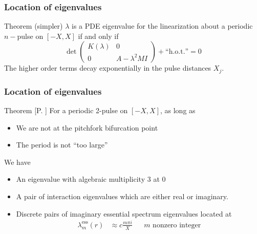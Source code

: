 \documentclass[16pt]{beamer}
\begin{document}
\begin{frame}
\frametitle{Location of eigenvalues} 
	\fontsize{14}{7.2}\selectfont
    \begin{block}{Theorem (simpler)}
    $\lambda$ is a PDE eigenvalue for the linearization about a periodic $n-$pulse on $[-X, X]$ if and only if 
    \[
    \det\begin{pmatrix}K(\lambda) & 0 \\ 0 & A - \lambda^2  M I \end{pmatrix} + \text{``h.o.t.''} = 0
    \]
    The higher order terms decay exponentially in the pulse distances $X_j$.
    \end{block}
\end{frame}

\begin{frame}
\frametitle{Location of eigenvalues} 
	\fontsize{14}{7.2}\selectfont
    \begin{block}{Theorem [P. ]}
    For a periodic 2-pulse on $[-X, X]$, as long as
    \begin{itemize}
    	\item We are not at the pitchfork bifurcation point
    	\item The period is not ``too large''
    \end{itemize}
    We have
    \begin{itemize}
    	\item An eigenvalue with algebraic multiplicity 3 at 0
    	\item A pair of interaction eigenvalues which are either real or imaginary.
    	\item Discrete pairs of imaginary essential spectrum eigenvalues located at
    	\begin{align*}
    	\lambda_m^{\text{ess}}(r) &\approx c \frac{m \pi i}{X} && m \text{ nonzero integer}
    	\end{align*}
    \end{itemize}
    \end{block}
\end{frame}
\end{document}
